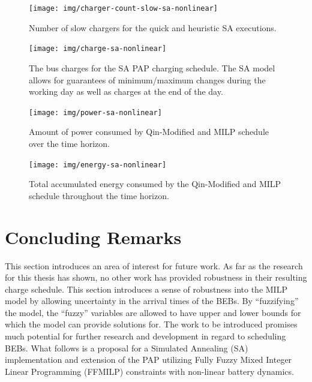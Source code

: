 \documentclass[ee,thesis]{usuthesis}
\begin{document}
\begin{figure}[h]
  \centering
  \texttt{[image: img/charger-count-slow-sa-nonlinear]}
  \caption{Number of slow chargers for the quick and heuristic SA executions.}
  \label{subfig:slow-charger-usage-sa}
\end{figure}

\begin{figure}[h]
  \texttt{[image: img/charge-sa-nonlinear]}
  \caption{The bus charges for the SA PAP charging schedule. The SA model allows for guarantees of minimum/maximum changes during the working day as well as charges at the end of the day.}
  \label{subfig:sa-heuristic-charge}
\end{figure}

\begin{figure}[h]
  \centering
  \texttt{[image: img/power-sa-nonlinear]}
  \caption{Amount of power consumed by Qin-Modified and MILP schedule over the time horizon.}
  \label{fig:power-usage-sa}
  \label{fig:power}
\end{figure}

\begin{figure}[htpb]
\centering \texttt{[image: img/energy-sa-nonlinear]}
    \caption{Total accumulated energy consumed by the Qin-Modified and MILP schedule throughout the time horizon.}
    \label{fig:energy-usage}
\end{figure}

\chapter{Concluding Remarks}
\label{sec:conclusion}
\makeappendices
{}
\label{sec:fuzzy-sa-pap}

This section introduces an area of interest for future work. As far as the research for this thesis has shown, no other
work has provided robustness in their resulting charge schedule. This section introduces a sense of robustness into the
MILP model by allowing uncertainty in the arrival times of the BEBs. By “fuzzifying” the model, the “fuzzy” variables
are allowed to have upper and lower bounds for which the model can provide solutions for. The work to be introduced
promises much potential for further research and development in regard to scheduling BEBs. What follows is a proposal
for a Simulated Annealing (SA) implementation and extension of the PAP utilizing Fully Fuzzy Mixed Integer Linear
Programming (FFMILP) constraints with non-linear battery dynamics.
\end{document}
